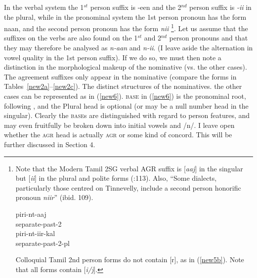 \documentclass[output=paper,colorlinks,citecolor=brown,
]{langscibook}
\begin{document}
In the verbal system the 1$^{st}$ person suffix is -een and the 2$^{nd}$ person suffix is \textit{-ii} in the plural, while in the pronominal system the 1st person pronoun has the form naan, and the second person pronoun has the form \textit{nii} \footnote{Note that the Modern Tamil 2SG verbal AGR suffix is [\textit{aaj}] in the singular but [\textit{ii}] in the plural and polite forms (\citealt{steever2019dravidian}:113). Also, “Some dialects, particularly those centred on Tinnevelly, include a second person honorific pronoun \textit{niir}” (ibid. 109).


\begin{exe}
\ex \label{newfootnote1a}
\gll piri-nt-aaj \\
separate-past-2 \\

\ex \label{newfootnote1b}
\gll piri-nt-iir-kal \\ 
separate-past-2-pl \\
\end{exe}


Colloquial Tamil 2nd person forms do not contain [r], as in (\ref{new5b}). Note that all forms contain [\textit{i/j}].
}.   Let us assume that the suffixes on the verbs are also found on the 1$^{st}$ and 2$^{nd}$ person pronouns and that they may therefore be analysed as          \textit{n-aan} and \textit{n-ii}. (I leave aside the alternation in vowel quality in the 1st person suffix). If we do so, we must then note a distinction in the morphological makeup of the nominative (vs. the other cases). The agreement suffixes only appear in the nominative (compare the forms in Tables~\ref{new2a}--\ref{new2c}). The distinct structures of the nominatives. the other cases can be represented as in (\ref{new6}). \textsc{base} in (\ref{new6}) is the pronominal root, following \citet{SmithBobaljik2019}, and the Plural head is optional (or may be a null number head in the singular). Clearly the \textsc{base}s are distinguished with regard to person features, and may even fruitfully be broken down into initial vowels and /n/. I leave open whether the \textsc{agr} head is actually \textsc{agr} or some kind of concord. This will be further discussed in Section 4.
\end{document}
